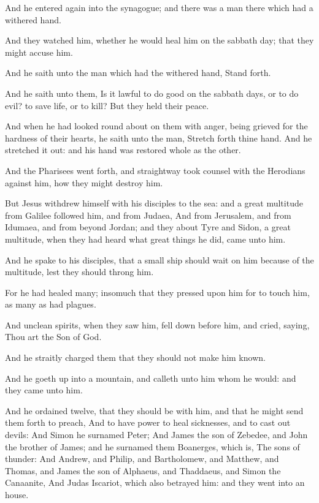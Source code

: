\Chapter
\Verse And he entered again into the synagogue; and there was a man there which had a withered hand.

\Verse And they watched him, whether he would heal him on the sabbath day; that they might accuse him.

\Verse And he saith unto the man which had the withered hand, Stand forth.

\Verse And he saith unto them, Is it lawful to do good on the sabbath days, or to do evil? to save life, or to kill? But they held their peace.

\Verse And when he had looked round about on them with anger, being grieved for the hardness of their hearts, he saith unto the man, Stretch forth thine hand. And he stretched it out: and his hand was restored whole as the other.

\Verse And the Pharisees went forth, and straightway took counsel with the Herodians against him, how they might destroy him.

\Verse But Jesus withdrew himself with his disciples to the sea: and a great multitude from Galilee followed him, and from Judaea, \Verse And from Jerusalem, and from Idumaea, and from beyond Jordan; and they about Tyre and Sidon, a great multitude, when they had heard what great things he did, came unto him.

\Verse And he spake to his disciples, that a small ship should wait on him because of the multitude, lest they should throng him.

\Verse For he had healed many; insomuch that they pressed upon him for to touch him, as many as had plagues.

\Verse And unclean spirits, when they saw him, fell down before him, and cried, saying, Thou art the Son of God.

\Verse And he straitly charged them that they should not make him known.

\Verse And he goeth up into a mountain, and calleth unto him whom he would: and they came unto him.

\Verse And he ordained twelve, that they should be with him, and that he might send them forth to preach, \Verse And to have power to heal sicknesses, and to cast out devils: \Verse And Simon he surnamed Peter; \Verse And James the son of Zebedee, and John the brother of James; and he surnamed them Boanerges, which is, The sons of thunder: \Verse And Andrew, and Philip, and Bartholomew, and Matthew, and Thomas, and James the son of Alphaeus, and Thaddaeus, and Simon the Canaanite, \Verse And Judas Iscariot, which also betrayed him: and they went into an house.

